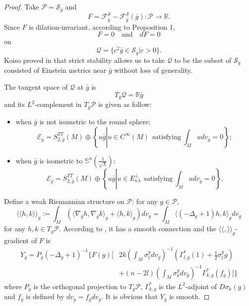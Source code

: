 \documentclass[12pt]{amsart}
\newcommand{\bg}{\bar{g}}
\numberwithin{equation}{section}
\begin{document}
\begin{proof}
    Take $\mathcal{P}=\mathcal{S}_{\bg}$ and
    \begin{equation*}
        F=\mathcal{F}_{\bg}^{\mathcal{S}}-\mathcal{F}_{\bg}^{\mathcal{S}}(\bg):\mathcal{P}\rightarrow\mathbb{R}.
    \end{equation*}
    Since $F$ is dilation-invariant, according to Proposition 1, 
    \begin{equation*}
        F=0\quad\mathrm{and}\quad dF=0
    \end{equation*}
    on
    \begin{equation*}
        \mathcal{Q}=\{c^2\bg\in\mathcal{S}_{\bg}|c>0\}.
    \end{equation*}
    Koiso proved in \cite{Koiso1980} that strict stability allows us to take $\mathcal{Q}$ to be the subset of $\mathcal{S}_{\bg}$ consisted of Einstein metrics near $\bg$ without loss of generality.

    The tangent space of $\mathcal{Q}$ at $\bg$ is 
    \begin{equation*}
        T_{\bg}\mathcal{Q}=\mathbb{R}\bg
    \end{equation*}
    and its $L^2$-complement in $T_{\bg}\mathcal{P}$ is given as follow:
    \begin{itemize}
        \item when $\bg$ is not isometric to the round sphere: $$\mathcal{E}_{\bg}=S_{2,\bg}^{TT}(M)\oplus \left\{u\bg \left|u\in C^{\infty}(M)\ \ \mathrm{satisfying}\ \int_M udv_{\bg}=0 \right. \right\};$$ 
        \item when $\bg$ is isometric to $\mathbb{S}^n(\frac{1}{\sqrt{\lambda}})$: $$\mathcal{E}_{\bg}=S_{2,\bg}^{TT}(M)\oplus \left\{u\bg \left|u\in E_{n\lambda}^{\perp}\ \ \mathrm{satisfying}\ \int_M udv_{\bg}=0  \right. \right \}.$$ 
    \end{itemize}

    Define a weak Riemannian structure on $\mathcal{P}$: for any $g\in\mathcal{P}$,
    \begin{equation*}
        \langle\langle h,k\rangle\rangle_g:=\int_M\left(\langle\nabla_gh,\nabla_gk\rangle_g+\langle h,k\rangle_g\right)dv_g=\int_M\langle(-\Delta_g+1)h,k\rangle_gdv_g
    \end{equation*}
    for any $h,k\in T_g\mathcal{P}$. According to \cite{Ebin1970}, it has a smooth connection and the $\langle\langle,\rangle\rangle_g$-gradient of $F$ is 
    \begin{equation*}
    \begin{split}
        Y_g=P_g(-\Delta_g+1)^{-1}\Bigg\{F(g)\bigg[&2k\left(\int_M\sigma_l^gdv_g\right)^{-1}\left(\Gamma_{l,g}^*(1)+\frac{1}{2}\sigma_l^gg\right)\\
        &+(n-2l)\left(\int_M\sigma_k^gdv_{\bg}\right)^{-1}\Gamma_{k,g}^*(f_g)\bigg]\Bigg\}
    \end{split}
    \end{equation*}
    where $P_g$ is the orthogonal projection to $T_g\mathcal{P}$, $\Gamma_{k,g}^*$ is the $L^2$-adjoint of $D\sigma_k(g)$ and $f_g$ is defined by $dv_{\bg}=f_gdv_g$. It is obvious that $Y_g$ is smooth. 
    

\end{proof}
\end{document}
